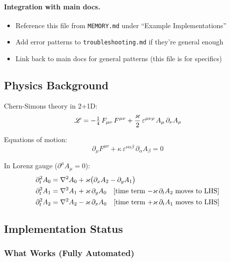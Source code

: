 \paragraph{Integration with main docs.}
\label{par:cs-integration}
\begin{itemize}
  \item Reference this file from \texttt{MEMORY.md} under ``Example Implementations''
  \item Add error patterns to \texttt{troubleshooting.md} if they're general enough
  \item Link back to main docs for general patterns (this file is for specifics)
\end{itemize}

\subsection{Physics Background}
\label{sec:cs-physics}

Chern-Simons theory in 2+1D:
\begin{equation}
  \mathscr{L} = -\tfrac{1}{4}\, F_{\mu\nu}\, F^{\mu\nu}
       + \frac{\varkappa}{2}\, \varepsilon^{\mu\nu\rho}\, A_\mu\, \partial_\nu A_\rho
  \label{eq:cs-lagrangian}
\end{equation}

Equations of motion:
\begin{equation}
  \partial_\mu F^{\mu\nu} + \kappa\, \varepsilon^{\nu\alpha\beta}\, \partial_\alpha A_\beta = 0
  \label{eq:cs-eom}
\end{equation}

In Lorenz gauge ($\partial^\mu A_\mu = 0$):
\begin{align}
  \partial_t^2 A_0 &= \nabla^2 A_0 + \varkappa\bigl(\partial_x A_2 - \partial_y A_1\bigr) \label{eq:cs-lorenz-A0} \\
  \partial_t^2 A_1 &= \nabla^2 A_1 + \varkappa\,\partial_y A_0 \quad\text{[time term $-\varkappa\,\partial_t A_2$ moves to LHS]} \label{eq:cs-lorenz-A1} \\
  \partial_t^2 A_2 &= \nabla^2 A_2 - \varkappa\,\partial_x A_0 \quad\text{[time term $+\varkappa\,\partial_t A_1$ moves to LHS]} \label{eq:cs-lorenz-A2}
\end{align}

\subsection{Implementation Status}
\label{sec:cs-status}

\subsubsection{What Works (Fully Automated)}
\label{sec:cs-works}

